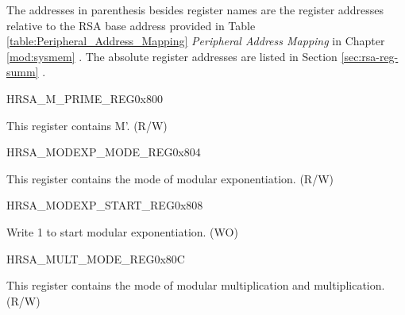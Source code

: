 The addresses in parenthesis besides register names are the register addresses relative to the RSA base address provided in Table \ref{table:Peripheral_Address_Mapping} \textit{Peripheral Address Mapping} in Chapter \ref{mod:sysmem} \textit{}. The absolute register addresses are listed in Section \ref{sec:rsa-reg-summ} \textit{}. 

\begin{register}{H}{RSA\_M\_PRIME\_REG}{0x800}\label{regdesc:RSAMPRIMEREG}
%
\regnewline%
\begin{regdesc}\begin{reglist}
\item [RSA\_M\_PRIME\_REG]This register contains M'. (R/W)
\end{reglist}\end{regdesc}
\end{register}


\begin{register}{H}{RSA\_MODEXP\_MODE\_REG}{0x804}\label{regdesc:RSAMODEXPMODEREG}
%
%
\regnewline%
\begin{regdesc}\begin{reglist}
\item [RSA\_MODEXP\_MODE]This register contains the mode of modular exponentiation. (R/W)
\end{reglist}\end{regdesc}
\end{register}


\begin{register}{H}{RSA\_MODEXP\_START\_REG}{0x808}\label{regdesc:RSAMODEXPSTARTREG}
%
%
\regnewline%
\begin{regdesc}\begin{reglist}
\item [RSA\_MODEXP\_START]Write 1 to start modular exponentiation. (WO)
\end{reglist}\end{regdesc}
\end{register}


\begin{register}{H}{RSA\_MULT\_MODE\_REG}{0x80C}\label{regdesc:RSAMULTMODEREG}
%
%
\regnewline%
\begin{regdesc}\begin{reglist}
\item [RSA\_MULT\_MODE]This register contains the mode of modular multiplication and multiplication. (R/W)
\end{reglist}\end{regdesc}
\end{register}


